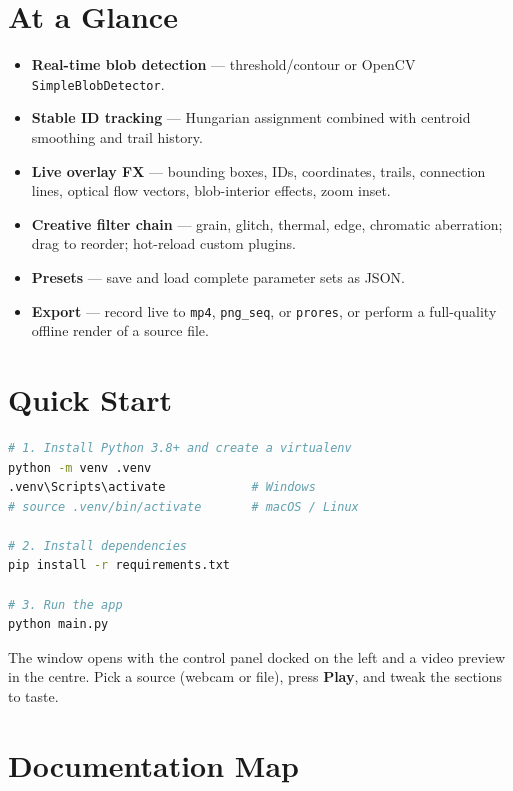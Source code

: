 \documentclass[11pt,a4paper,openany]{report}
\begin{document}
\section{At a Glance}

\begin{itemize}
    \item \textbf{Real-time blob detection} --- threshold/contour or OpenCV
        \texttt{SimpleBlobDetector}.
    \item \textbf{Stable ID tracking} --- Hungarian assignment combined with
        centroid smoothing and trail history.
    \item \textbf{Live overlay FX} --- bounding boxes, IDs, coordinates,
        trails, connection lines, optical flow vectors, blob-interior
        effects, zoom inset.
    \item \textbf{Creative filter chain} --- grain, glitch, thermal, edge,
        chromatic aberration; drag to reorder; hot-reload custom plugins.
    \item \textbf{Presets} --- save and load complete parameter sets as JSON.
    \item \textbf{Export} --- record live to \texttt{mp4}, \texttt{png\_seq},
        or \texttt{prores}, or perform a full-quality offline render of a
        source file.
\end{itemize}

\section{Quick Start}

\begin{lstlisting}[language=bash]
# 1. Install Python 3.8+ and create a virtualenv
python -m venv .venv
.venv\Scripts\activate            # Windows
# source .venv/bin/activate       # macOS / Linux

# 2. Install dependencies
pip install -r requirements.txt

# 3. Run the app
python main.py
\end{lstlisting}

The window opens with the control panel docked on the left and a video
preview in the centre. Pick a source (webcam or file), press \textbf{Play},
and tweak the sections to taste.

\section{Documentation Map}
\end{document}
